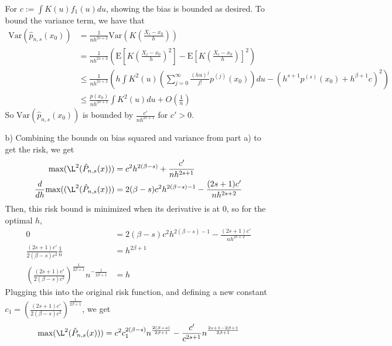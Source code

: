 \documentclass[11pt]{article}
\newcommand{\E}{\mathrm{E}}
\newcommand{\var}{\mathrm{Var}}
\theoremstyle{definition}
\begin{document}
\begin{itemize}
\begin{itemize}
                For \(c:=\int K(u) f_1(u) du\), showing the bias is bounded as desired. To bound the variance term, we have that
                \begin{align*}
                    \var\left(\hat p_{n,s}(x_0)\right) &= \frac{1}{nh^{2s+2}}\var\left(K\left(\frac{X_i-x_0}{h}\right)\right) \\
                                                     &= \frac{1}{nh^{2s+2}}\left(\E\left[K\left(\frac{X_i-x_0}{h}\right)^2\right]-\E\left[K\left(\frac{X_i-x_0}{h}\right)\right]^2\right) \\
                                                     &\leq \frac{1}{nh^{2s+2}}\left(h\int K^2(u)\left(\sum_{j=0}^\infty \frac{(hu)^j}{j!}p^{(j)}(x_0)\right)du-\left(h^{s+1}p^{(s)}(x_0)+ h^{\beta+1}c\right)^2\right) \\
                                                     &\leq \frac{p(x_0)}{nh^{2s+1}}\int K^2(u)du + O\left(\frac{1}{n}\right)
                \end{align*}
                So \(\var\left(\hat p_{n,s}(x_0)\right)\) is bounded by \(\frac{c'}{nh^{2s+1}}\) for \(c'>0\).
            \item[b)]
                Combining the bounds on bias squared and variance from part a) to get the risk, we get
                \begin{align*}
                    \mbox{max}(\L^2(\hat P_{n,s}(x))) &= c^2h^{2(\beta-s)}+\frac{c'}{nh^{2s+1}} \\
                    \frac{d}{dh}\mbox{max}((\L^2(\hat P_{n,s}(x))) &= 2(\beta-s)c^2h^{2(\beta-s)-1}-\frac{(2s+1)c'}{nh^{2s+2}} 
                \end{align*}
                Then, this risk bound is minimized when its derivative is at $0$, so for the optimal $h$,
                \begin{align*}
                    0 &= 2(\beta-s)c^2h^{2(\beta-s)-1}-\frac{(2s+1)c'}{nh^{2s+2}} \\
                    \frac{(2s+1)c'}{2(\beta-s)c^2}\frac{1}{n} &= h^{2\beta+1} \\
                    \left(\frac{(2s+1)c'}{2(\beta-s)c^2}\right)^\frac{1}{2\beta+1}n^{-\frac{1}{2\beta+1}} &= h 
                \end{align*}
                Plugging this into the original risk function, and defining a new constant \(c_1=\left(\frac{(2s+1)c'}{2(\beta-s)c^2}\right)^\frac{1}{2\beta+1}\), we get
                \begin{align*}
                    \mbox{max}(\L^2(\hat P_{n,s}(x)))  &= c^2c_1^{2(\beta-s)}n^{\frac{2(\beta-s)}{2\beta+1}}-\frac{c'}{c^{2s+1}}n^{\frac{2s+1-2\beta+1}{2\beta+1}} \\

\end{align*}
\end{itemize}
\end{itemize}
\end{document}
